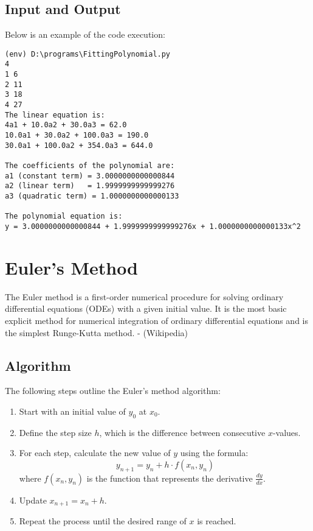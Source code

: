 \documentclass[12pt]{article}
\begin{document}
\subsection*{Input and Output}
Below is an example of the code execution:
{\small
\begin{verbatim}
(env) D:\programs\FittingPolynomial.py
4
1 6
2 11
3 18
4 27
The linear equation is: 
4a1 + 10.0a2 + 30.0a3 = 62.0
10.0a1 + 30.0a2 + 100.0a3 = 190.0
30.0a1 + 100.0a2 + 354.0a3 = 644.0

The coefficients of the polynomial are:
a1 (constant term) = 3.0000000000000844
a2 (linear term)   = 1.9999999999999276
a3 (quadratic term) = 1.0000000000000133

The polynomial equation is:
y = 3.0000000000000844 + 1.9999999999999276x + 1.0000000000000133x^2
\end{verbatim}
}



    \newpage
    \section*{Euler's Method}
   The Euler method is a first-order numerical procedure for solving ordinary differential equations (ODEs) with a given initial value. It is the most basic explicit method for numerical integration of ordinary differential equations and is the simplest Runge-Kutta method. - (Wikipedia)
    
    \subsection*{Algorithm}
    
    The following steps outline the Euler's method algorithm:
    
    \begin{enumerate}
        \item Start with an initial value of \( y_0 \) at \( x_0 \).
        \item Define the step size \( h \), which is the difference between consecutive \( x \)-values.
        \item For each step, calculate the new value of \( y \) using the formula:
        \[
            y_{n+1} = y_n + h \cdot f(x_n, y_n)
            \]
            where \( f(x_n, y_n) \) is the function that represents the derivative \( \frac{dy}{dx} \).
            \item Update \( x_{n+1} = x_n + h \).
            \item Repeat the process until the desired range of \( x \) is reached.
        \end{enumerate}
        
\end{document}
